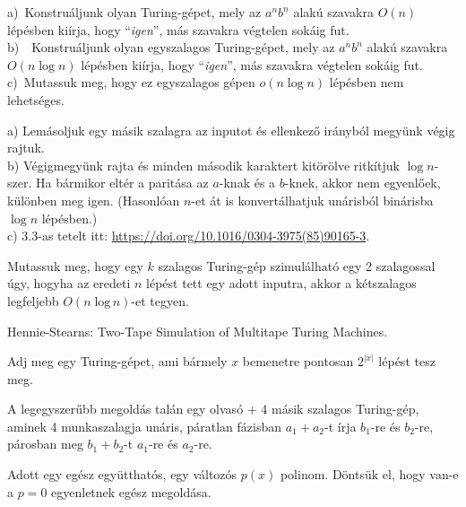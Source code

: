 \begin{Exercise}[counter={sorszam}, difficulty=0]	
a)~Konstruáljunk olyan Turing-gépet, mely az $a^nb^n$ alak\'u
szavakra $O(n)$ l\'ep\'esben ki\'irja, hogy ``{\it igen}'',
m\'as szavakra v\'egtelen sok\'aig fut.\\
b)~~Konstruáljunk olyan egyszalagos Turing-gépet, mely az $a^nb^n$ alak\'u
szavakra $O(n \log n)$ l\'ep\'esben ki\'irja, hogy ``{\it igen}'',
m\'as szavakra v\'egtelen sok\'aig fut.\\
c)~\hard Mutassuk meg, hogy ez egyszalagos gépen $o(n\log n)$ l\'ep\'esben nem lehets\'eges.
\end{Exercise}	 
\begin{Answer}
	a) Lem\'asoljuk egy m\'asik szalagra az inputot \'es ellenkez\H o ir\'anyb\'ol megy\"unk v\'egig rajtuk.\\
	b) V\'egigmegy\"unk rajta \'es minden m\'asodik karaktert kit\"or\"olve ritk\'itjuk $\log n$-szer. Ha b\'armikor elt\'er a parit\'asa az $a$-knak \'es a $b$-knek, akkor nem egyenl\H oek, k\"ul\"onben meg igen.
	(Hasonl\'oan $n$-et \'at is konvert\'alhatjuk un\'arisb\'ol bin\'arisba $\log n$ l\'ep\'esben.)\\
	c) 3.3-as tetelt itt: \url{https://doi.org/10.1016/0304-3975(85)90165-3}.
\end{Answer}

\begin{Exercise}[counter={sorszam}, difficulty=1]
	Mutassuk meg, hogy egy $k$ szalagos Turing-gép szimulálható egy 2 szalagossal úgy, hogyha az eredeti $n$ lépést tett egy adott inputra, akkor a kétszalagos legfeljebb $O(n \mathrm{\;log\,} n)$-et tegyen.
\end{Exercise}	 
\begin{Answer}
	Hennie-Stearns: Two-Tape Simulation of Multitape Turing Machines.
\end{Answer}


\begin{Exercise}[counter={sorszam}, difficulty=0]
	 Adj meg egy Turing-gépet, ami b\'armely $x$ bemenetre pontosan $2^{|x|}$ lépést tesz meg.
\end{Exercise}	 
\begin{Answer}
	A legegyszer\H ubb megold\'as tal\'an egy olvas\'o + 4 m\'asik szalagos Turing-g\'ep, aminek 4 munkaszalagja un\'aris, p\'aratlan f\'azisban $a_1+a_2$-t \'irja $b_1$-re \'es $b_2$-re, p\'arosban meg $b_1+b_2$-t $a_1$-re \'es $a_2$-re.
\end{Answer}

\begin{Exercise}[counter={sorszam}, difficulty=0]
	Adott egy egész együtthatós, egy változós $p(x)$ polinom. Döntsük el, hogy van-e a $p= 0$ egyenletnek egész megoldása.
\end{Exercise}	



